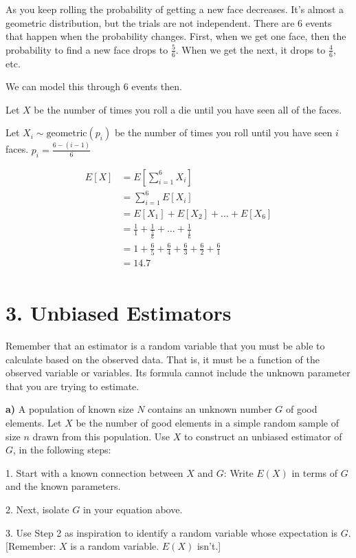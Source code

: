 \documentclass{report}
\begin{document}
As you keep rolling the probability of getting a new face decreases. It's almost a geometric distribution, but the trials are not independent. There are 6 events that happen when the probability changes. First, when we get one face, then the probability to find a new face drops to $ \frac{5}{6} $. When we get the next, it drops to $ \frac{4}{6} $, etc. 

We can model this through 6 events then. 

Let $ X $ be the number of times you roll a die until you have seen all of the faces. 

Let $ X_i \sim \text{geometric}(p_i) $ be the number of times you roll until you have seen $ i $ faces. $ p_i = \frac{6-(i-1)}{6} $ 

\begin{align*}
	E[X] &= E\left[\sum_{i=1}^{6}X_i \right]\\
	&= \sum_{i=1}^{6}E[X_i] \\
	&= E[X_1] + E[X_2] + \dots + E[X_6]\\
	&= \frac{1}{1} + \frac{1}{\frac{5}{6}} + \dots + \frac{1}{\frac{1}{6}} \\
	&= 1 + \frac{6}{5} + \frac{6}{4} + \frac{6}{3} + \frac{6}{2} + \frac{6}{1} \\
	&= 14.7 \\
\end{align*}


\newpage
\section*{3. Unbiased Estimators} 

Remember that an estimator is a random variable that you must be able to calculate based on the observed data. That is, it must be a function of the observed variable or variables. Its formula cannot include the unknown parameter that you are trying to estimate. 

\textbf{a)} A population of known size $N$ contains an unknown number $G$ of good elements. Let $X$ be the number of good elements in a simple random sample of size $n$ drawn from this population. Use $X$ to construct an unbiased estimator of $G$, in the following steps:

1. Start with a known connection between $X$ and $G$: Write $E(X)$ in terms of $G$ and the known parameters.

2. Next, isolate $G$ in your equation above.

3. Use Step 2 as inspiration to identify a random variable whose expectation is $G$. [Remember: $X$ is a random variable. $E(X)$ isn't.]
\end{document}
